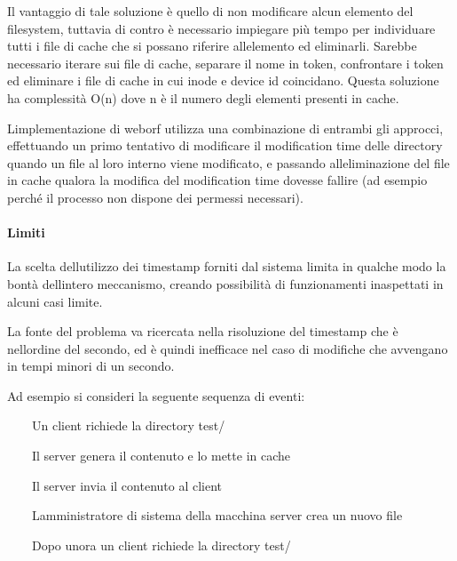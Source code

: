 \documentclass[a4paper,11pt]{article}
\begin{document}
{\sffamily
Il vantaggio di tale soluzione \`e quello di non modificare alcun
elemento del filesystem, tuttavia di contro \`e necessario impiegare
pi\`u tempo per individuare tutti i file di cache che si possano
riferire all{\textquotesingle}elemento ed eliminarli. Sarebbe
necessario iterare sui file di cache, separare il nome in token,
confrontare i token ed eliminare i file di cache in cui inode e device
id coincidano. Questa soluzione ha complessit\`a O(n) dove n \`e il
numero degli elementi presenti in cache.}


\bigskip

{\sffamily
L{\textquotesingle}implementazione di weborf utilizza una combinazione
di entrambi gli approcci, effettuando un primo tentativo di modificare
il modification time delle directory quando un file al loro interno
viene modificato, e passando all{\textquotesingle}eliminazione del file
in cache qualora la modifica del modification time dovesse fallire (ad
esempio perch\'e il processo non dispone dei permessi necessari).}


\bigskip

\paragraph{Limiti}
{\sffamily
La scelta dell{\textquotesingle}utilizzo dei timestamp forniti dal
sistema limita in qualche modo la bont\`a dell{\textquotesingle}intero
meccanismo, creando possibilit\`a di funzionamenti inaspettati in
alcuni casi limite.}

{\sffamily
La fonte del problema va ricercata nella risoluzione del timestamp che
\`e nell{\textquotesingle}ordine del secondo, ed \`e quindi inefficace
nel caso di modifiche che avvengano in tempi minori di un secondo.}


\bigskip

{\sffamily
Ad esempio si consideri la seguente sequenza di eventi:}


\bigskip

{\sffamily
\ \ \ \ Un client richiede la directory test/}

{\sffamily
\ \ \ \ Il server genera il contenuto e lo mette in cache}

{\sffamily
\ \ \ \ Il server invia il contenuto al client}

{\sffamily
\ \ \ \ L{\textquotesingle}amministratore di sistema della macchina
server crea un nuovo file}

{\sffamily
\ \ \ \ Dopo un{\textquotesingle}ora un client richiede la directory
test/}
\end{document}
